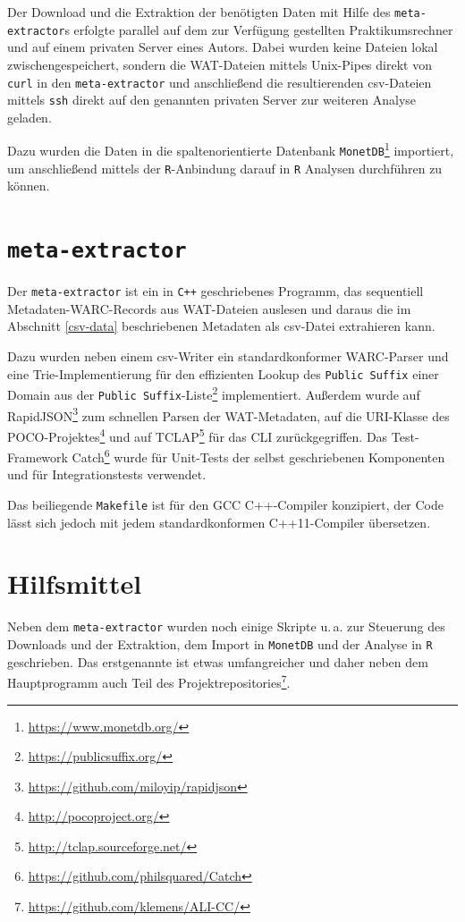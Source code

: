 \documentclass[a4paper,12pt,titlepage=false]{scrreprt}
\begin{document}
Der Download und die Extraktion der benötigten Daten mit Hilfe des
\texttt{meta-extractor}s erfolgte parallel auf dem zur Verfügung gestellten
Praktikumsrechner und auf einem privaten Server eines Autors. Dabei wurden keine
Dateien lokal zwischengespeichert, sondern die WAT-Dateien mittels Unix-Pipes
direkt von \texttt{curl} in den \texttt{meta-extractor} und anschließend die
resultierenden csv-Dateien mittels \texttt{ssh} direkt auf den genannten
privaten Server zur weiteren Analyse geladen.

Dazu wurden die Daten in die spaltenorientierte Datenbank
\texttt{MonetDB}\footnote{\url{https://www.monetdb.org/}} importiert, um
anschließend mittels der \texttt{R}-Anbindung darauf in \texttt{R} Analysen
durchführen zu können.

\section{\texttt{meta-extractor}}

Der \texttt{meta-extractor} ist ein in \texttt{C++} geschriebenes Programm,
das sequentiell Metadaten-WARC-Records aus WAT-Dateien auslesen und daraus
die im Abschnitt \ref{csv-data} beschriebenen Metadaten als csv-Datei extrahieren
kann.

Dazu wurden neben einem csv-Writer ein standardkonformer WARC-Parser und eine
Trie-Implementierung für den effizienten Lookup des \texttt{Public Suffix} einer
Domain aus der \texttt{Public Suffix}-Liste\footnote{\url{https://publicsuffix.org/}} implementiert. Außerdem wurde auf RapidJSON\footnote{\url{https://github.com/miloyip/rapidjson}}
zum schnellen Parsen der WAT-Metadaten, auf die URI-Klasse des
POCO-Projektes\footnote{\url{http://pocoproject.org/}} und auf
TCLAP\footnote{\url{http://tclap.sourceforge.net/}} für das CLI zurückgegriffen. Das Test-Framework Catch\footnote{\url{https://github.com/philsquared/Catch}} wurde für Unit-Tests der selbst geschriebenen Komponenten und für Integrationstests verwendet.

Das beiliegende \texttt{Makefile} ist für den GCC C++-Compiler konzipiert, der Code lässt sich jedoch mit jedem standardkonformen C++11-Compiler übersetzen.

\section{Hilfsmittel}

Neben dem \texttt{meta-extractor} wurden noch einige Skripte u.\,a. zur
Steuerung des Downloads und der Extraktion, dem Import in \texttt{MonetDB} und
der Analyse in \texttt{R} geschrieben. Das erstgenannte ist etwas umfangreicher
und daher neben dem Hauptprogramm auch Teil des
Projektrepositories\footnote{\url{https://github.com/klemens/ALI-CC/}}.
\end{document}
